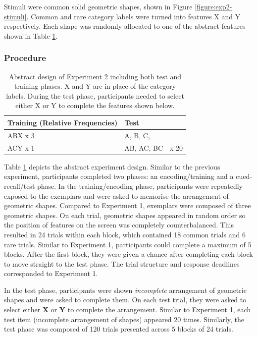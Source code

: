 \documentclass[10pt,letterpaper]{article}
\begin{document}
Stimuli were common solid geometric shapes, shown in Figure \ref*{figure:exp2-stimuli}.
Common and rare category labels were turned into features X and Y respectively.
Each shape was randomly allocated to one of the abstract features shown in Table \ref*{tab:abstract-exp2}.

\subsubsection{Procedure}

\begin{table}[!ht]
  \begin{center}
    \caption{Abstract design of Experiment 2 including both test and training phases. X and Y are in place of the category labels. During the test phase, participants needed to select either X or Y to complete the features shown below.\\}
    \label{tab:abstract-exp2}
    \begin{tabular}{llr} %
      \textbf{Training (Relative Frequencies)} & \textbf{Test}& \\
      \hline
      ABX x 3 &  A, B, C,        & \\
      ACY x 1 &  AB, AC, BC      & x 20 \\
      \hline
    \end{tabular}
  \end{center}
\end{table}

Table \ref*{tab:abstract-exp2} depicts the abstract experiment design.
Similar to the previous experiment, participants completed two phases: an encoding/training and a cued-recall/test phase.
In the training/encoding phase, participants were repeatedly exposed to the exemplars and were asked to memorise the arrangement of geometric shapes.
Compared to Experiment 1, exemplars were composed of three geometric shapes.
On each trial, geometric shapes appeared in random order so the position of features on the screen was completely counterbalanced.
This resulted in 24 trials within each block, which contained 18 common trials and 6 rare trials.
Similar to Experiment 1, participants could complete a maximum of 5 blocks.
After the first block, they were given a chance after completing each block to move straight to the test phase.
The trial structure and response deadlines corresponded to Experiment 1.

In the test phase, participants were shown \textit{incomplete} arrangement of geometric shapes and were asked to complete them.
On each test trial, they were asked to select either \textbf{X} or \textbf{Y} to complete the arrangement.
Similar to Experiment 1, each test item (incomplete arrangement of shapes) appeared 20 times. 
Similarly, the test phase was composed of 120 trials presented across 5 blocks of 24 trials.
\end{document}
